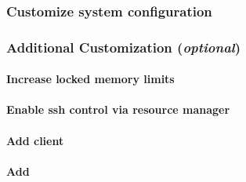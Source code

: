 \documentclass[letterpaper]{article}
\begin{document}
\vspace*{-0.25cm}
\subsubsection{Customize system configuration} \label{sec:master_customization}




\subsubsection{Additional Customization ({\em optional})} \label{sec:addl_customizations}


\paragraph{Increase locked memory limits}


\paragraph{Enable ssh control via resource manager}


\paragraph{Add \Lustre{} client} \label{sec:lustre_client}




\vspace*{0.4cm}

\paragraph{Add \clustershell{}}

\end{document}

